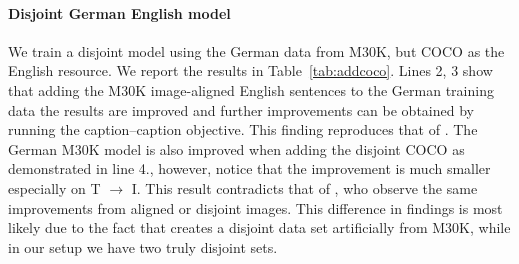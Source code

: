 \paragraph{Disjoint German English model}

We train a disjoint model
using the German data from M30K, but COCO as the English
resource. We report the results in Table~\ref{tab:addcoco}.
Lines 2, 3 show that adding the M30K image-aligned English sentences to the
German training data the results are improved and further improvements can be
obtained by running the caption--caption objective. This finding reproduces 
that of \cite{kadar2018conll}. The German M30K model is also 
improved when adding the disjoint COCO as demonstrated in line 4., however, 
notice that the improvement is much smaller especially on T $\rightarrow$ I. 
This result contradicts that  of \cite{kadar2018conll}, who observe
the same improvements from aligned or disjoint images. 
This difference in findings is most likely due to the fact that
\cite{kadar2018conll} creates a disjoint data set artificially
from M30K, while in our setup we have two truly disjoint sets.

